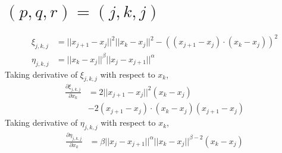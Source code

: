 \documentclass[a4paper]{article}
\newcommand{\norm}[1]{||#1||}
\begin{document}
\section{$(p,q,r) = (j, k, j)$}
\begin{align}
    \xi_{j,k,j} &= \norm{x_{j+1} - x_{j}}^2 \norm{x_k - x_j}^2- \left( \left( x_{j+1} - x_{j} \right) \cdot \left( x_{k} - x_{j} \right) \right)^2 \\
    \eta_{j,k,j} &= \norm{x_k - x_j}^{\beta} \norm{x_{j} - x_{j+1}}^{\alpha}
\end{align}
Taking derivative of $\xi_{j,k,j}$ with respect to $x_k$,
\begin{align}
    \frac{\partial \xi_{j,k,j}}{\partial x_k} &= 2 \norm{x_{j+1} - x_j}^2 \left( x_k - x_j \right) \\
    &- 2 \left( x_{j+1} - x_j \right) \cdot \left( x_k - x_j \right) \left( x_{j+1} - x_j \right)
\end{align}
Taking derivative of $\eta_{j,k,j}$ with respect to $x_k$,
\begin{align}
    \frac{\partial \eta_{j,k,j}}{\partial x_k} &= \beta \norm{x_j - x_{j+1}}^{\alpha} \norm{x_k - x_j}^{\beta - 2} \left( x_k - x_j \right)
\end{align}
\end{document}
